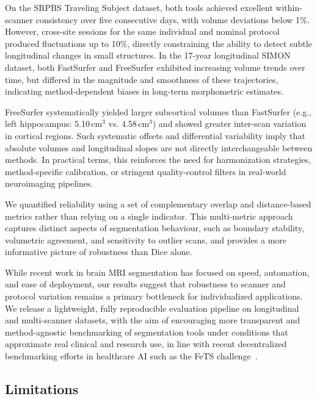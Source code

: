 \documentclass{midl} %
\begin{document}
On the SRPBS Traveling Subject dataset, both tools achieved excellent within-scanner consistency over five consecutive days, with volume deviations below 1\%. However, cross-site sessions for the same individual and nominal protocol produced fluctuations up to 10\%, directly constraining the ability to detect subtle longitudinal changes in small structures. In the 17-year longitudinal SIMON dataset, both FastSurfer and FreeSurfer exhibited increasing volume trends over time, but differed in the magnitude and smoothness of these trajectories, indicating method-dependent biases in long-term morphometric estimates.

FreeSurfer systematically yielded larger subcortical volumes than FastSurfer (e.g., left hippocampus: 5.10\,cm$^3$ vs. 4.58\,cm$^3$) and showed greater inter-scan variation in cortical regions. Such systematic offsets and differential variability imply that absolute volumes and longitudinal slopes are not directly interchangeable between methods. In practical terms, this reinforces the need for harmonization strategies, method-specific calibration, or stringent quality-control filters in real-world neuroimaging pipelines.

We quantified reliability using a set of complementary overlap and distance-based metrics rather than relying on a single indicator. This multi-metric approach captures distinct aspects of segmentation behaviour, such as boundary stability, volumetric agreement, and sensitivity to outlier scans, and provides a more informative picture of robustness than Dice alone.

While recent work in brain MRI segmentation has focused on speed, automation, and ease of deployment, our results suggest that robustness to scanner and protocol variation remains a primary bottleneck for individualized applications. We release a lightweight, fully reproducible evaluation pipeline on longitudinal and multi-scanner datasets, with the aim of encouraging more transparent and method-agnostic benchmarking of segmentation tools under conditions that approximate real clinical and research use, in line with recent decentralized benchmarking efforts in healthcare AI such as the FeTS challenge~\citep{Zenk2025FeTS}.

\subsection{Limitations}

\end{document}
